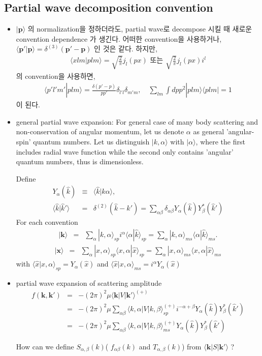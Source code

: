 \documentclass[10pt]{article}
\def\bm{\boldsymbol}
\newcommand{\bea}{\begin{eqnarray}}
\newcommand{\eea}{\end{eqnarray}}
\newcommand{\no}{\nonumber \\}
\def\vp{{\bm p}}
\def\vk{{\bm k}}
\def\vx{{\bm x}}
\def\la{\langle}
\def\ra{\rangle}
\begin{document}
\subsection{Partial wave decomposition convention }
\begin{itemize}
\item
$|\vp\ra$ 의 normalization을 정하더라도, partial wave로 decompose
시킬 때 새로운 convention dependence 가 생긴다. 
어떠한 convention을 사용하거나, 
$\la \vp'|\vp\ra=\delta^{(3)}(\vp'-\vp)$ 인 것은 같다. 하지만, 
\bea
\la x lm| p lm\ra=\sqrt{\frac{2}{\pi}}j_l(px)\mbox{ 또는 } 
    \sqrt{\frac{2}{\pi}}j_l(px) i^l
\eea
의 convention을 사용하면,
\bea
\la p' l' m'|p lm\ra=\frac{\delta(p'-p)}{pp'}\delta_{l'l}\delta_{m'm},
\quad
\sum_{lm}\int dp p^2|p lm\ra\la p lm|=1
\eea
이 된다.

\item general partial wave expansion: 
For general case of many body scattering and 
non-conservation of angular momentum, let us
denote $\alpha$ as general
'angular-spin' quantum numbers. 
Let us distinguish
$|k,\alpha\ra$ with $|\alpha\ra$, where the first includes
radial wave function while the second only contains 
'angular' quantum numbers, thus is dimensionless. 

Define
\bea
Y_{\alpha}(\hat{k})&\equiv&\la \hat{k}|k \alpha\ra,\no
\la \hat{k}|\hat{k}'\ra&=&\delta^{(2)}(\hat{k}-\hat{k}')
 =\sum_{\alpha\beta}\delta_{\alpha\beta} 
  Y_{\alpha}(\hat{k})Y_{\beta}^*(\hat{k}')
\eea
For each convention
\bea
|\vk\ra&=&
\sum_\alpha |k, \alpha\ra_{sp}  
                i^\alpha \la \alpha|\hat{k}\ra_{sp}
                =
\sum_\alpha |k, \alpha\ra_{ms}  
            \la \alpha|\hat{k}\ra_{ms}.
\eea
\bea
|\vx\ra&=&\sum_{\alpha} |x,\alpha\ra_{sp} 
           \la x,\alpha|\hat{x}\ra_{sp}
       =\sum_{\alpha} |x,\alpha\ra_{ms} 
           \la x,\alpha|\hat{x}\ra_{ms}
\eea
with $\la \hat{x}|x,\alpha \ra_{sp}=Y_{\alpha}(\hat{x})$
and $\la \hat{x}|x,\alpha \ra_{ms}=i^\alpha Y_{\alpha}(\hat{x})$

\item partial wave expansion of scattering amplitude
\bea
f(\vk,\vk')&=&-(2\pi)^2\mu \la \vk|V|\vk'\ra^{(+)}\no
           &=&-(2\pi)^2\mu \sum_{\alpha\beta} 
        \la k,\alpha|V| k,\beta\ra^{(+)}_{sp}
        i^{-\alpha+\beta}
        Y_{\alpha}(\hat{k})Y_{\beta}^*(\hat{k}') \no
        &=&-(2\pi)^2\mu \sum_{\alpha\beta} 
        \la k,\alpha|V| k,\beta\ra^{(+)}_{ms}
        Y_{\alpha}(\hat{k})Y_{\beta}^*(\hat{k}')  
\eea

How can we define $S_{\alpha,\beta}(k)$( $f_{\alpha\beta}(k)$
and $T_{\alpha,\beta}(k)$) from $\la \vk| S|\vk' \ra$ ?



\end{itemize}
\end{document}
